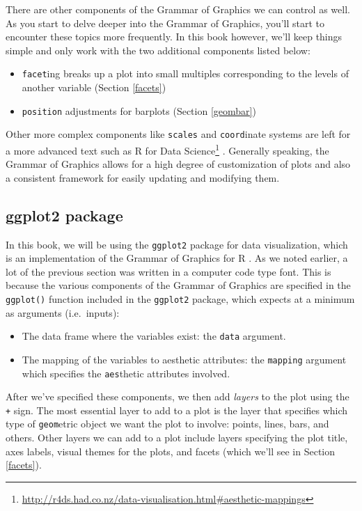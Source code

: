\documentclass[12pt, krantz2,]{krantz}
\providecommand{\tightlist}{%
  \setlength{\itemsep}{0pt}\setlength{\parskip}{0pt}}
\renewcommand{\href}[2]{#2\footnote{\url{#1}}}
\begin{document}
There are other components of the Grammar of Graphics we can control as well. As you start to delve deeper into the Grammar of Graphics, you'll start to encounter these topics more frequently. In this book however, we'll keep things simple and only work with the two additional components listed below:

\begin{itemize}
\tightlist
\item
  \texttt{facet}ing breaks up a plot into small multiples corresponding to the levels of another variable (Section \ref{facets})
\item
  \texttt{position} adjustments for barplots (Section \ref{geombar})
\end{itemize}

Other more complex components like \texttt{scales} and \texttt{coord}inate systems are left for a more advanced text such as \href{http://r4ds.had.co.nz/data-visualisation.html\#aesthetic-mappings}{R for Data Science} \citep{rds2016}. Generally speaking, the Grammar of Graphics allows for a high degree of customization of plots and also a consistent framework for easily updating and modifying them.

\hypertarget{ggplot2-package}{%
\subsection{ggplot2 package}\label{ggplot2-package}}

In this book, we will be using the \texttt{ggplot2} package for data visualization, which is an implementation of the Grammar of Graphics for R \citep{R-ggplot2}. As we noted earlier, a lot of the previous section was written in a computer code type font. This is because the various components of the Grammar of Graphics are specified in the \texttt{ggplot()} function included in the \texttt{ggplot2} package, which expects at a minimum as arguments (i.e.~inputs):

\begin{itemize}
\tightlist
\item
  The data frame where the variables exist: the \texttt{data} argument.
\item
  The mapping of the variables to aesthetic attributes: the \texttt{mapping} argument which specifies the \texttt{aes}thetic attributes involved.
\end{itemize}

After we've specified these components, we then add \emph{layers} to the plot using the \texttt{+} sign. The most essential layer to add to a plot is the layer that specifies which type of \texttt{geom}etric object we want the plot to involve: points, lines, bars, and others. Other layers we can add to a plot include layers specifying the plot title, axes labels, visual themes for the plots, and facets (which we'll see in Section \ref{facets}).
\end{document}
